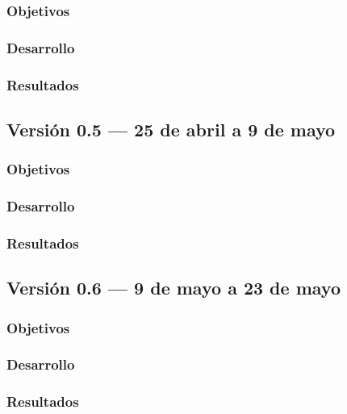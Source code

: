 \subsubsection{Objetivos}

\subsubsection{Desarrollo}

\subsubsection{Resultados}

\subsection{Versión 0.5 --- 25 de abril a 9 de mayo}

\subsubsection{Objetivos}

\subsubsection{Desarrollo}

\subsubsection{Resultados}

\subsection{Versión 0.6 --- 9 de mayo a 23 de mayo}

\subsubsection{Objetivos}

\subsubsection{Desarrollo}

\subsubsection{Resultados}
